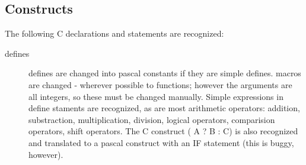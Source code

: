 \subsection{Constructs}
The following C declarations and statements are recognized:

\begin{description}
\item[defines] 
defines are changed into pascal constants if they are simple defines.
macros are changed - wherever possible to functions; however the arguments
are all integers, so these must be changed manually. Simple expressions 
in define staments are recognized, as are most arithmetic operators: 
addition, substraction, multiplication, division, logical operators, 
comparision operators, shift operators. The C construct ( A ? B : C)
is also recognized and translated to a pascal construct with an IF
statement (this is buggy, however).


\end{description}
